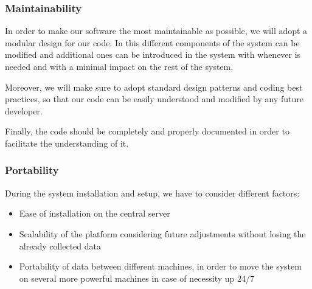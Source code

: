 \subsubsection{Maintainability}

In order to make our software the most maintainable as possible, we will adopt a modular design for our code. In this different components of the system can be modified and additional ones can be introduced in the system with whenever is needed and with a minimal impact on the rest of the system.

Moreover, we will make sure to adopt standard design patterns and coding best practices, so that our code can be easily understood and modified by any future developer.

Finally, the code should be completely and properly documented in order to facilitate the understanding of it. 

\subsubsection{Portability}

During the system installation and setup, we have to consider different factors:

\begin{itemize}
\item Ease of installation on the central server
\item Scalability of the platform considering future adjustments without losing the already collected data
\item Portability of data between different machines, in order to move the system on several more powerful machines in case of necessity
up 24/7
\end{itemize}



